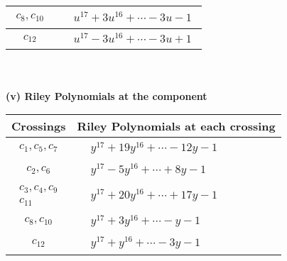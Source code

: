 \documentclass[1p]{elsarticle_modified}
\theoremstyle{definition}
\begin{document}
\begin{tabular}{m{50pt}|m{274pt}}
\hline $$\begin{aligned}c_{8},c_{10}\end{aligned}$$&$\begin{aligned}
&u^{17}+3 u^{16}+\cdots-3 u-1
\end{aligned}$\\
\hline $$\begin{aligned}c_{12}\end{aligned}$$&$\begin{aligned}
&u^{17}-3 u^{16}+\cdots-3 u+1
\end{aligned}$\\
\hline
\end{tabular}\\~\\
\newpage\renewcommand{\arraystretch}{1}
\flushleft \textbf{(v) Riley Polynomials at the component}\newline \\
\begin{tabular}{m{50pt}|m{274pt}}
Crossings & \hspace{64pt}Riley Polynomials at each crossing \\
\hline $$\begin{aligned}c_{1},c_{5},c_{7}\end{aligned}$$&$\begin{aligned}
&y^{17}+19 y^{16}+\cdots-12 y-1
\end{aligned}$\\
\hline $$\begin{aligned}c_{2},c_{6}\end{aligned}$$&$\begin{aligned}
&y^{17}-5 y^{16}+\cdots+8 y-1
\end{aligned}$\\
\hline $$\begin{aligned}c_{3},c_{4},c_{9}\\c_{11}\end{aligned}$$&$\begin{aligned}
&y^{17}+20 y^{16}+\cdots+17 y-1
\end{aligned}$\\
\hline $$\begin{aligned}c_{8},c_{10}\end{aligned}$$&$\begin{aligned}
&y^{17}+3 y^{16}+\cdots- y-1
\end{aligned}$\\
\hline $$\begin{aligned}c_{12}\end{aligned}$$&$\begin{aligned}
&y^{17}+y^{16}+\cdots-3 y-1
\end{aligned}$\\
\hline
\end{tabular}\\~\\
\end{document}
